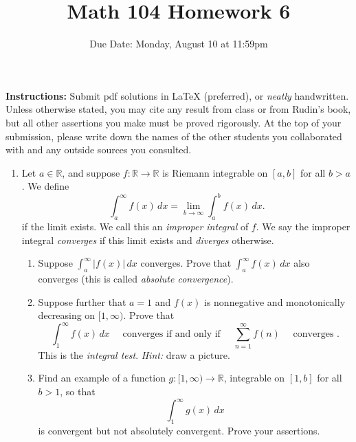 \documentclass[12pt, letterpaper]{article}
\title{Math 104 Homework 6}
\author{Due Date: Monday, August 10 at 11:59pm}
\date{}
\newcommand{\0}{\mathbf{0}}
\newcommand{\1}{\mathbf{1}}
\begin{document}
\maketitle

\textbf{Instructions:} Submit pdf solutions in LaTeX (preferred), or \textit{neatly} handwritten. Unless otherwise stated, you may cite any result from class or from Rudin's book, but all other assertions you make must be proved rigorously. At the top of your submission, please write down the names of the other students you collaborated with and any outside sources you consulted.

\vspace{0.5cm}

\begin{enumerate}
    \item 
    Let $a \in \mathbb{R}$, and suppose $f : \mathbb{R} \to \mathbb{R}$ is Riemann integrable on $[a, b]$ for all $b > a$. We define
    \begin{equation*}
        \int_{a}^{\infty} f(x)\,dx = \lim_{b \to \infty} \int_{a}^{b} f(x)\,dx.
    \end{equation*}
    if the limit exists. We call this an \textit{improper integral} of $f$. We say the improper integral \textit{converges} if this limit exists and \textit{diverges} otherwise. 
    \begin{enumerate}
        \item 
        Suppose $\int_{a}^{\infty} |f(x)|\,dx$ converges. Prove that $\int_{a}^{\infty} f(x)\,dx$ also converges (this is called \textit{absolute convergence}).\\
        
        \item 
        Suppose further that $a = 1$ and $f(x)$ is nonnegative and monotonically decreasing on $[1, \infty)$. Prove that
        \begin{equation*}
            \int_{1}^{\infty} f(x)\,dx \quad \text{ converges if and only if } \quad \sum_{n = 1}^{\infty} f(n) \quad \text{ converges }.
        \end{equation*}
        This is the \textit{integral test}. \textit{Hint:} draw a picture.\\

        \item 
        Find an example of a function $g : [1, \infty) \to \mathbb{R}$, integrable on $[1, b]$ for all $b > 1$, so that
        \begin{equation*}
            \int_{1}^{\infty} g(x)\,dx
        \end{equation*}
        is convergent but not absolutely convergent. Prove your assertions.
        

\end{enumerate}
\end{enumerate}
\end{document}
